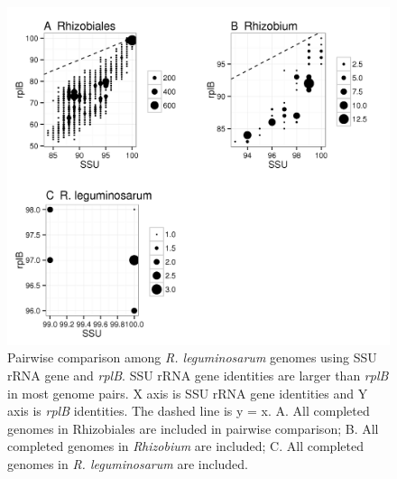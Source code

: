 \documentclass[]{msu-thesis}
\begin{document}
\begin{figure}[tbph!]
  \centering
  \includegraphics[scale=1]{figs/R_leg}
  \caption[Pairwise comparison among \textit{R. leguminosarum} genomes using SSU rRNA gene and \textit{rplB}]{Pairwise comparison among \textit{R. leguminosarum} genomes using SSU rRNA gene and \textit{rplB}. SSU rRNA gene identities are larger than \textit{rplB} in most genome pairs. X axis is SSU rRNA gene identities and Y axis is \textit{rplB} identities. The dashed line is y = x. A. All completed genomes in Rhizobiales are included in pairwise comparison; B. All completed genomes in \textit{\textit{Rhizobium}} are included; C. All completed genomes in \textit{R. leguminosarum} are included.}
  \label{fig:RLeg}
\end{figure}
\end{document}

